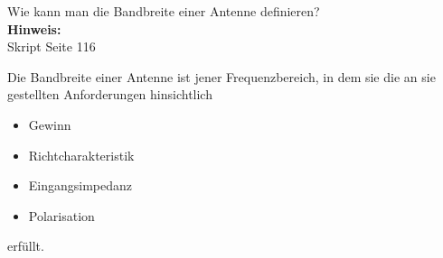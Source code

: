 \begin{question}[section=11,name={Bandbreite},difficulty=,quantity=6,type=thr,tags={20151210,20131210,20061016}]
	Wie kann man die Bandbreite einer Antenne definieren?
	\\ \textbf{Hinweis:}\\
	Skript Seite 116
\end{question}
\begin{solution}
	Die Bandbreite einer Antenne ist jener Frequenzbereich, in dem sie die an sie gestellten Anforderungen hinsichtlich
	\begin{itemize}
		\item{Gewinn}
		\item{Richtcharakteristik}
		\item{Eingangsimpedanz}
		\item{Polarisation}
	\end{itemize}
	erfüllt.
\end{solution}

